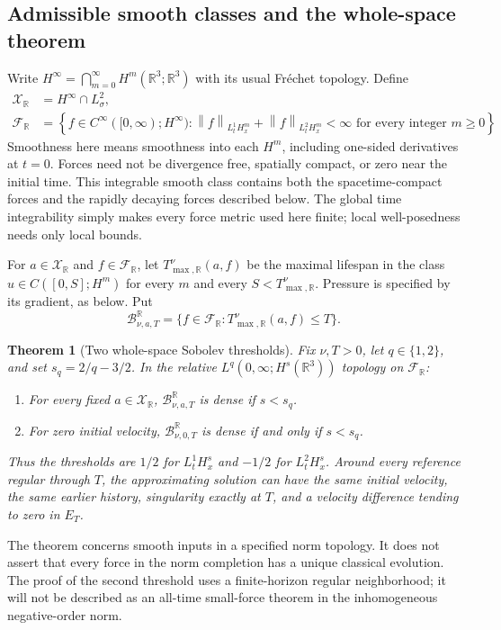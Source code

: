 \documentclass[11pt,a4paper]{article}
\newtheorem{theorem}{Theorem}[section]
\theoremstyle{definition}\newtheorem{definition}[theorem]{Definition}
\theoremstyle{remark}\newtheorem{remark}[theorem]{Remark}
\newcommand{\R}{\mathbb R}\newcommand{\TT}{\mathbb T^3}
\newcommand{\norm}[1]{\left\lVert#1\right\rVert}
\begin{document}
\subsection{Admissible smooth classes and the whole-space theorem}
Write $H^\infty=\bigcap_{m=0}^\infty H^m(\R^3;\R^3)$ with its usual Fr\'echet topology. Define
\begin{align}
 \mathcal X_{\R}&=H^\infty\cap L^2_\sigma,\nonumber\\
 \mathcal F_{\R}&=\left\{f\in C^\infty([0,\infty);H^\infty):
 \norm{f}_{L^1_tH^m_x}+\norm{f}_{L^2_tH^m_x}<\infty
 \text{ for every integer }m\ge0\right\}.\label{eq:Rclasses}
\end{align}
Smoothness here means smoothness into each $H^m$, including one-sided derivatives at $t=0$. Forces need not be divergence free, spatially compact, or zero near the initial time. This integrable smooth class contains both the spacetime-compact forces and the rapidly decaying forces described below. The global time integrability simply makes every force metric used here finite; local well-posedness needs only local bounds.

For $a\in\mathcal X_{\R}$ and $f\in\mathcal F_{\R}$, let $T^\nu_{\max,\R}(a,f)$ be the maximal lifespan in the class $u\in C([0,S];H^m)$ for every $m$ and every $S<T^\nu_{\max,\R}$. Pressure is specified by its gradient, as below. Put
\[
 \mathcal B^\R_{\nu,a,T}
 =\{f\in\mathcal F_{\R}:T^\nu_{\max,\R}(a,f)\le T\}.
\]

\begin{theorem}[Two whole-space Sobolev thresholds]\label{thm:Rmain}
Fix $\nu,T>0$, let $q\in\{1,2\}$, and set $s_q=2/q-3/2$. In the relative $L^q(0,\infty;H^s(\R^3))$ topology on $\mathcal F_{\R}$:
\begin{enumerate}[label=(\roman*),nosep]
\item For every fixed $a\in\mathcal X_{\R}$, $\mathcal B^\R_{\nu,a,T}$ is dense if $s<s_q$.
\item For zero initial velocity, $\mathcal B^\R_{\nu,0,T}$ is dense if and only if $s<s_q$.
\end{enumerate}
Thus the thresholds are $1/2$ for $L^1_tH^s_x$ and $-1/2$ for $L^2_tH^s_x$. Around every reference regular through $T$, the approximating solution can have the same initial velocity, the same earlier history, singularity exactly at $T$, and a velocity difference tending to zero in $E_T$.
\end{theorem}

The theorem concerns smooth inputs in a specified norm topology. It does not assert that every force in the norm completion has a unique classical evolution. The proof of the second threshold uses a finite-horizon regular neighborhood; it will not be described as an all-time small-force theorem in the inhomogeneous negative-order norm.
\end{document}
